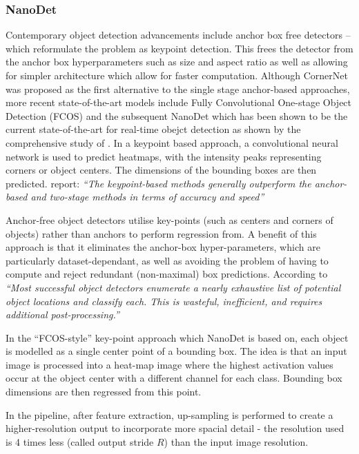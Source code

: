 \documentclass[a4paper,twoside,12pt]{report}
\begin{document}
\subsubsection{NanoDet}

Contemporary object detection advancements include anchor box free detectors -- which reformulate the problem as keypoint detection. This frees the detector from the anchor box hyperparameters such as size and aspect ratio as well as allowing for simpler architecture which allow for faster computation. Although CornerNet \citep{cornernet} was proposed as the first alternative to the single stage anchor-based approaches, more recent state-of-the-art models include Fully Convolutional One-stage Object Detection (FCOS) \citep{fcos} and the subsequent NanoDet \citep{nanodet} which has been shown to be the current state-of-the-art for real-time obejct detection as shown by the comprehensive study of \cite{comprehensive}. In a keypoint based approach, a convolutional neural network is used to predict heatmaps, with the intensity peaks representing corners or object centers. The dimensions of the  bounding boxes are then predicted. \cite{comprehensive} report: \textit{``The keypoint-based methods generally outperform the anchor-based and two-stage methods in terms of accuracy and speed''} 

Anchor-free object detectors utilise key-points (such as centers and corners of objects) rather than anchors to perform regression from. A benefit of this approach is that it eliminates the anchor-box hyper-parameters, which are particularly dataset-dependant, as well as avoiding the problem of having to compute and reject redundant (non-maximal) box predictions. According to \cite{cnet} \textit{``Most successful object detectors enumerate a nearly exhaustive list of potential object locations and classify each. This is wasteful, inefficient, and requires additional post-processing.''}  

In the ``FCOS-style'' key-point approach which NanoDet is based on, each object is modelled as a single center point of a bounding box. The idea is that an input image is processed into a heat-map image where the highest activation values occur at the object center with a different channel for each class. Bounding box dimensions are then regressed from this point. 

In the pipeline, after feature extraction, up-sampling is performed to create a higher-resolution output to incorporate more spacial detail - the resolution used is 4 times less (called output stride $R$) than the input image resolution.
\end{document}
